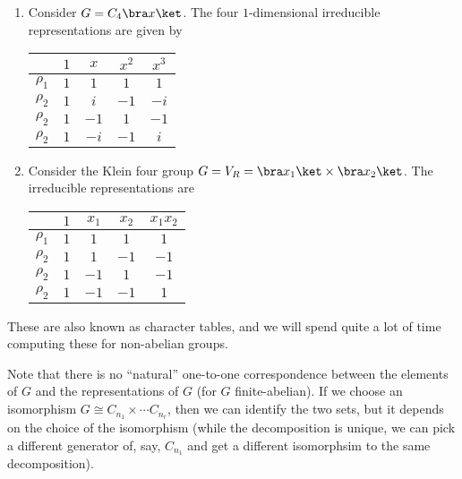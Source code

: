 \documentclass[a4paper]{article}
\begin{document}
\begin{eg}\leavevmode
  \begin{enumerate}
    \item Consider $G = C_4 \bra x\ket$. The four $1$-dimensional irreducible representations are given by
      \begin{center}
        \begin{tabular}{ccccc}
          \toprule
          & $1$ & $x$ & $x^2$ & $x^3$\\
          \midrule
          $\rho_1$ & $1$ & $1$ & $1$ & $1$\\
          $\rho_2$ & $1$ & $i$ & $-1$ & $-i$\\
          $\rho_2$ & $1$ & $-1$ & $1$ & $-1$\\
          $\rho_2$ & $1$ & $-i$ & $-1$ & $i$\\
          \bottomrule
        \end{tabular}
      \end{center}
    \item Consider the Klein four group $G = V_R = \bra x_1 \ket \times \bra x_2\ket$. The irreducible representations are
      \begin{center}
        \begin{tabular}{ccccc}
          \toprule
          & $1$ & $x_1$ & $x_2$ & $x_1x_2$\\
          \midrule
          $\rho_1$ & $1$ & $1$ & $1$ & $1$\\
          $\rho_2$ & $1$ & $1$ & $-1$ & $-1$\\
          $\rho_2$ & $1$ & $-1$ & $1$ & $-1$\\
          $\rho_2$ & $1$ & $-1$ & $-1$ & $1$\\
          \bottomrule
        \end{tabular}
      \end{center}
  \end{enumerate}
\end{eg}
These are also known as character tables, and we will spend quite a lot of time computing these for non-abelian groups.

Note that there is no ``natural'' one-to-one correspondence between the elements of $G$ and the representations of $G$ (for $G$ finite-abelian). If we choose an isomorphism $G \cong C_{n_1} \times \cdots C_{n_r}$, then we can identify the two sets, but it depends on the choice of the isomorphism (while the decomposition is unique, we can pick a different generator of, say, $C_{n_1}$ and get a different isomorphsim to the same decomposition).
\end{document}
